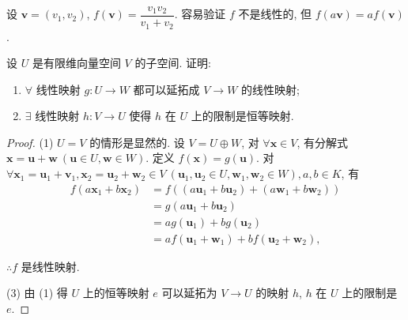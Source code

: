 \documentclass[color=black,device=normal,lang=cn,mode=geye]{elegantnote}
\begin{document}
\begin{solution}
    设 $\boldsymbol{v}=(v_1,v_2)$, $f(\boldsymbol{v})=\dfrac{v_1v_2}{v_1+v_2}$. 容易验证 $f$ 不是线性的, 但 $f(a\boldsymbol{v})=af(\boldsymbol{v})$.
\end{solution}
\begin{exercisec}[2.1.5]
    设 $U$ 是有限维向量空间 $V$ 的子空间. 证明:
    \begin{enumerate}
        \def\labelenumi{(\arabic{enumi})}
        \item $\forall$ 线性映射 $g:U\to W$ 都可以延拓成 $V\to W$ 的线性映射;
        \item $\exists$ 线性映射 $h:V\to U$ 使得 $h$ 在 $U$ 上的限制是恒等映射. 
    \end{enumerate}
\end{exercisec}
\begin{proof}
    (1) $U=V$ 的情形是显然的. 设 $V=U\oplus W$, 对 $\forall\boldsymbol{x}\in V$, 有分解式 $\boldsymbol{x}=\boldsymbol{u}+\boldsymbol{w}\ (\boldsymbol{u}\in U,\boldsymbol{w}\in W)$. 定义 $f(\boldsymbol{x})=g(\boldsymbol{u})$. 对 $\forall\boldsymbol{x}_1=\boldsymbol{u}_1+\boldsymbol{v}_1,\boldsymbol{x}_2=\boldsymbol{u}_2+\boldsymbol{w}_2\in V\ (\boldsymbol{u}_1,\boldsymbol{u}_2\in U,\boldsymbol{w}_1,\boldsymbol{w}_2\in W),a,b\in K$, 有
    \begin{align*}
        f(a\boldsymbol{x}_1+b\boldsymbol{x}_2) & =f((a\boldsymbol{u}_1+b\boldsymbol{u}_2)+(a\boldsymbol{w}_1+b\boldsymbol{w}_2)) \\
        & =g(a\boldsymbol{u}_1+b\boldsymbol{u}_2) \\
        & =ag(\boldsymbol{u}_1)+bg(\boldsymbol{u}_2) \\
        & =af(\boldsymbol{u}_1+\boldsymbol{w}_1)+bf(\boldsymbol{u}_2+\boldsymbol{w}_2),
    \end{align*}

    $\therefore f$ 是线性映射.

    (3) 由 (1) 得 $U$ 上的恒等映射 $e$ 可以延拓为 $V\to U$ 的映射 $h$, $h$ 在 $U$ 上的限制是 $e$.
\end{proof}
\end{document}
